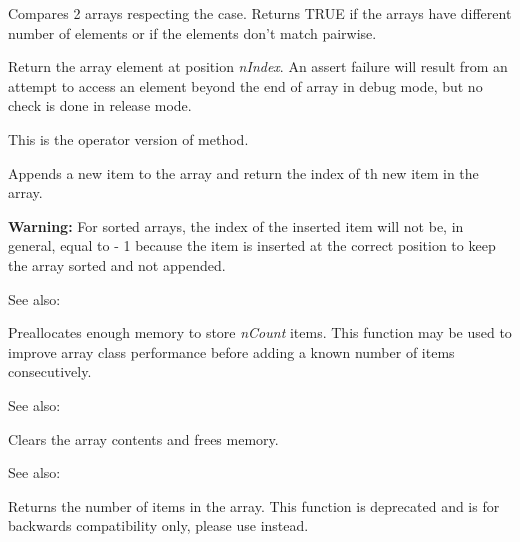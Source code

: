Compares 2 arrays respecting the case. Returns TRUE if the arrays have
different number of elements or if the elements don't match pairwise.

\label{wxarraystringoperatorindex}


Return the array element at position {\it nIndex}. An assert failure will
result from an attempt to access an element beyond the end of array in debug
mode, but no check is done in release mode.

This is the operator version of  method.

\label{wxarraystringadd}


Appends a new item to the array and return the index of th new item in the
array.

{\bf Warning:} For sorted arrays, the index of the inserted item will not be,
in general, equal to  - 1 because
the item is inserted at the correct position to keep the array sorted and not
appended.

See also: 

\label{wxarraystringalloc}


Preallocates enough memory to store {\it nCount} items. This function may be
used to improve array class performance before adding a known number of items
consecutively.

See also: 

\label{wxarraystringclear}


Clears the array contents and frees memory.

See also: 

\label{wxarraystringcount}


Returns the number of items in the array. This function is deprecated and is
for backwards compatibility only, please use 
 instead.

